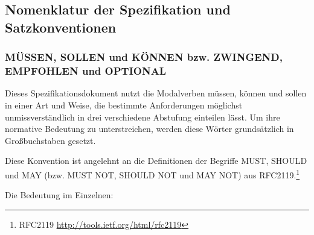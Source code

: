 \documentclass[,a4paper]{article}
\begin{document}
\subsection{Nomenklatur der Spezifikation und
Satzkonventionen}\label{nomenklatur-der-spezifikation-und-satzkonventionen}

\subsubsection{MÜSSEN, SOLLEN und KÖNNEN bzw. ZWINGEND, EMPFOHLEN und
OPTIONAL}\label{muxfcssen-sollen-und-kuxf6nnen-bzw.-zwingend-empfohlen-und-optional}

Dieses Spezifikationsdokument nutzt die Modalverben müssen, können und
sollen in einer Art und Weise, die bestimmte Anforderungen möglichst
unmissverständlich in drei verschiedene Abstufung einteilen lässt. Um
ihre normative Bedeutung zu unterstreichen, werden diese Wörter
grundsätzlich in Großbuchstaben gesetzt.

Diese Konvention ist angelehnt an die Definitionen der Begriffe MUST,
SHOULD und MAY (bzw. MUST NOT, SHOULD NOT und MAY NOT) aus
RFC2119.\footnote{RFC2119 \url{http://tools.ietf.org/html/rfc2119}}

Die Bedeutung im Einzelnen:
\end{document}
